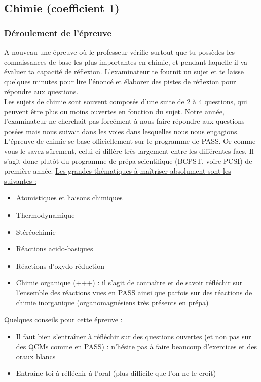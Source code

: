 \subsection{Chimie (coefficient 1)}
\subsubsection{Déroulement de l'épreuve}

A nouveau une épreuve où le professeur vérifie surtout que tu possèdes les connaissances de base les plus importantes en chimie, et pendant laquelle il va évaluer ta capacité de réflexion. L’examinateur te fournit un sujet et te laisse quelques minutes pour lire l’énoncé et élaborer des pistes de réflexion pour répondre aux questions.\\

Les sujets de chimie sont souvent composés d’une suite de 2 à 4 questions, qui peuvent être plus ou moins ouvertes en fonction du sujet. Notre année, l’examinateur ne cherchait pas forcément à nous faire répondre aux questions posées mais nous suivait dans les voies dans lesquelles nous nous engagions.\\

L’épreuve de chimie se base officiellement sur le programme de PASS. Or comme vous le savez sûrement, celui-ci diffère très largement entre les différentes facs. Il s’agit donc plutôt du programme de prépa scientifique (BCPST, voire PCSI) de première année. \uline{Les grandes thématiques à maîtriser absolument sont les suivantes :}

\begin{itemize}
\item Atomistiques et liaisons chimiques
\item Thermodynamique
\item Stéréochimie
\item Réactions acido-basiques
\item Réactions d’oxydo-réduction
\item Chimie organique (+++) : il s’agit de connaître et de savoir réfléchir sur l’ensemble des réactions vues en PASS ainsi que parfois sur des réactions de chimie inorganique (organomagnésiens très présents en prépa)
\end{itemize}

\vspace{.5cm}

\uline{Quelques conseils pour cette épreuve :}

\begin{itemize}
\item Il faut bien s’entraîner à réfléchir sur des questions ouvertes (et non pas sur des QCMs comme en PASS) : n’hésite pas à faire beaucoup d’exercices et des oraux blancs
\item Entraîne-toi à réfléchir à l’oral (plus difficile que l’on ne le croit)
\end{itemize}

